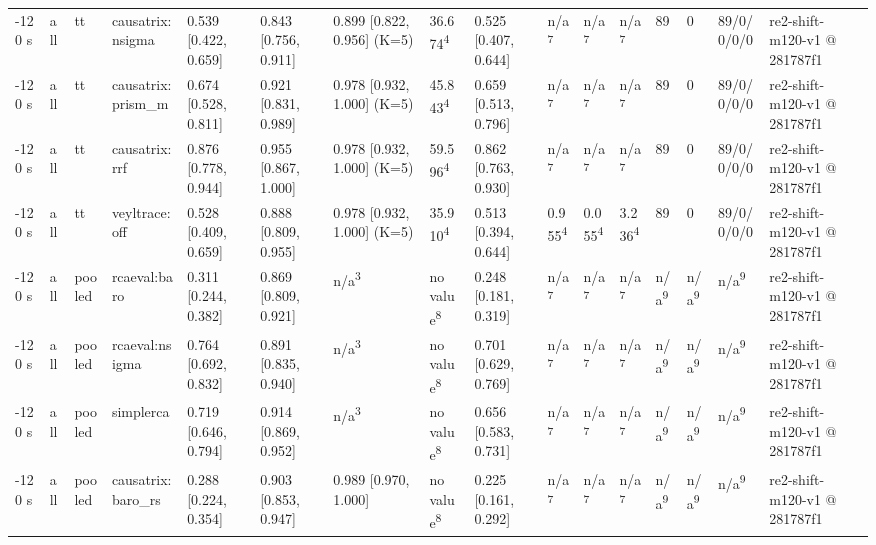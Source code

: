 \begin{table}[t]
\begin{tabular}{llllllllllllllll}
-120 s & all & tt & causatrix:nsigma & 0.539 [0.422, 0.659] & 0.843 [0.756, 0.911] & 0.899 [0.822, 0.956] (K=5) & 36.674\textsuperscript{4} & 0.525 [0.407, 0.644] & n/a\textsuperscript{7} & n/a\textsuperscript{7} & n/a\textsuperscript{7} & 89 & 0 & 89/0/0/0/0 & re2-shift-m120-v1 @ 281787f1 \\
-120 s & all & tt & causatrix:prism\_m & 0.674 [0.528, 0.811] & 0.921 [0.831, 0.989] & 0.978 [0.932, 1.000] (K=5) & 45.843\textsuperscript{4} & 0.659 [0.513, 0.796] & n/a\textsuperscript{7} & n/a\textsuperscript{7} & n/a\textsuperscript{7} & 89 & 0 & 89/0/0/0/0 & re2-shift-m120-v1 @ 281787f1 \\
-120 s & all & tt & causatrix:rrf & 0.876 [0.778, 0.944] & 0.955 [0.867, 1.000] & 0.978 [0.932, 1.000] (K=5) & 59.596\textsuperscript{4} & 0.862 [0.763, 0.930] & n/a\textsuperscript{7} & n/a\textsuperscript{7} & n/a\textsuperscript{7} & 89 & 0 & 89/0/0/0/0 & re2-shift-m120-v1 @ 281787f1 \\
-120 s & all & tt & veyltrace:off & 0.528 [0.409, 0.659] & 0.888 [0.809, 0.955] & 0.978 [0.932, 1.000] (K=5) & 35.910\textsuperscript{4} & 0.513 [0.394, 0.644] & 0.955\textsuperscript{4} & 0.055\textsuperscript{4} & 3.236\textsuperscript{4} & 89 & 0 & 89/0/0/0/0 & re2-shift-m120-v1 @ 281787f1 \\
-120 s & all & pooled & rcaeval:baro & 0.311 [0.244, 0.382] & 0.869 [0.809, 0.921] & n/a\textsuperscript{3} & no value\textsuperscript{8} & 0.248 [0.181, 0.319] & n/a\textsuperscript{7} & n/a\textsuperscript{7} & n/a\textsuperscript{7} & n/a\textsuperscript{9} & n/a\textsuperscript{9} & n/a\textsuperscript{9} & re2-shift-m120-v1 @ 281787f1 \\
-120 s & all & pooled & rcaeval:nsigma & 0.764 [0.692, 0.832] & 0.891 [0.835, 0.940] & n/a\textsuperscript{3} & no value\textsuperscript{8} & 0.701 [0.629, 0.769] & n/a\textsuperscript{7} & n/a\textsuperscript{7} & n/a\textsuperscript{7} & n/a\textsuperscript{9} & n/a\textsuperscript{9} & n/a\textsuperscript{9} & re2-shift-m120-v1 @ 281787f1 \\
-120 s & all & pooled & simplerca & 0.719 [0.646, 0.794] & 0.914 [0.869, 0.952] & n/a\textsuperscript{3} & no value\textsuperscript{8} & 0.656 [0.583, 0.731] & n/a\textsuperscript{7} & n/a\textsuperscript{7} & n/a\textsuperscript{7} & n/a\textsuperscript{9} & n/a\textsuperscript{9} & n/a\textsuperscript{9} & re2-shift-m120-v1 @ 281787f1 \\
-120 s & all & pooled & causatrix:baro\_rs & 0.288 [0.224, 0.354] & 0.903 [0.853, 0.947] & 0.989 [0.970, 1.000] & no value\textsuperscript{8} & 0.225 [0.161, 0.292] & n/a\textsuperscript{7} & n/a\textsuperscript{7} & n/a\textsuperscript{7} & n/a\textsuperscript{9} & n/a\textsuperscript{9} & n/a\textsuperscript{9} & re2-shift-m120-v1 @ 281787f1 \\

\end{tabular}
\end{table}
